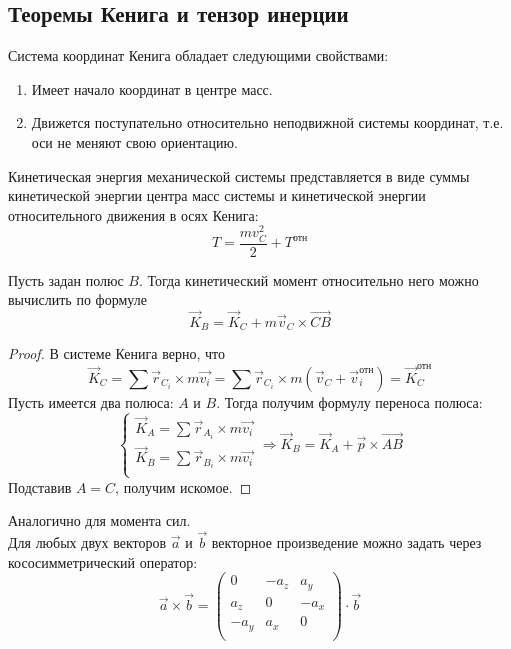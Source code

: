 \subsection{Теоремы Кенига и тензор инерции}

\begin{definition}
    Система координат Кенига обладает следующими свойствами:
    \begin{enumerate}
        \item Имеет начало координат в центре масс.
        \item Движется поступательно относительно неподвижной системы координат, т.е. оси не меняют свою ориентацию.
    \end{enumerate}
\end{definition}
\begin{theorem}
    Кинетическая энергия механической системы представляется в виде суммы кинетической энергии центра масс системы и кинетической энергии относительного движения в осях Кенига:
    \[
    T = \dfrac{mv_C^2}{2} + T^\text{отн}
    \]
\end{theorem}

\begin{theorem}
    Пусть задан полюс $B$. Тогда кинетический момент относительно него можно вычислить по формуле
    \[
    \vec{K}_B = \vec{K}_C +  m\vec{v}_C \times \vec{CB}
    \]
\end{theorem}
\begin{proof}
    В системе Кенига верно, что
    \[
    \vec{K}_C = \sum \vec{r}_{C_i} \times m\vec{v_i} = \sum \vec{r}_{C_i} \times m(\vec{v}_C +\vec{v}_i^{\text{отн}}) = \vec{K}_C^{\text{отн}}
    \]
    Пусть имеется два полюса: $A$ и $B$. Тогда получим формулу переноса полюса:
    \hypertarget{K_pole_shift}{}
    \[
    \begin{cases}
        \vec{K}_A = \sum \vec{r}_{A_i} \times m\vec{v_i}\\
        \vec{K}_B = \sum \vec{r}_{B_i} \times m\vec{v_i}\\
    \end{cases} \Longrightarrow \vec{K}_B = \vec{K}_A + \vec{p} \times \vec{AB}
    \]
    Подставив $A = C$, получим искомое.
\end{proof}

Аналогично для момента сил.\\

\hypertarget{tenzor}{}
Для любых двух векторов $\vec{a}$ и $\vec{b}$ векторное произведение можно задать через кососимметрический оператор:
\[
\vec{a} \times \vec{b} = \begin{pmatrix}
0 & -a_z & a_y\\
a_z & 0 & -a_x\\
-a_y & a_x & 0\\
\end{pmatrix} \cdot \vec{b}
\]


